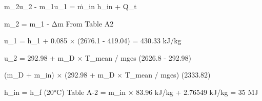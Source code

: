 m_2u_2 - m_1u_1 = ṁ_in h_in + Q_t  

m_2 = m_1 - Δm  
From Table A2  

u_1 = h_1 + 0.085 × (2676.1 - 419.04)  
= 430.33 kJ/kg  

u_2 = 292.98 + m_D × T_mean / mges  
(2626.8 - 292.98)  

(m_D + m_in) × (292.98 + m_D × T_mean / mges)  
(2333.82)  

h_in = h_f (20°C) Table A-2  
= m_in × 83.96 kJ/kg + 2.76549 kJ/kg  
= 35 MJ
